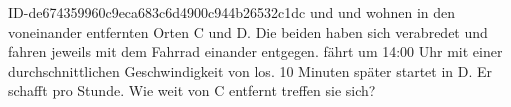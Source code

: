 \begin{exercise}
      {ID-de674359960c9eca683c6d4900c944b26532c1dc}
      {\xyc{} und \xyd}
  \ifproblem\problem
    \xyc{} und \xyd{} wohnen in den  voneinander entfernten Orten C und D.
    Die beiden haben sich verabredet und fahren jeweils mit dem Fahrrad einander
    entgegen. \xyc{} fährt um 14:00 Uhr mit einer durchschnittlichen Geschwindigkeit
    von  los. 10 Minuten später startet \xyd{} in D. Er schafft 
    pro Stunde. Wie weit von C entfernt treffen sie sich?
  \fi
\end{exercise}
